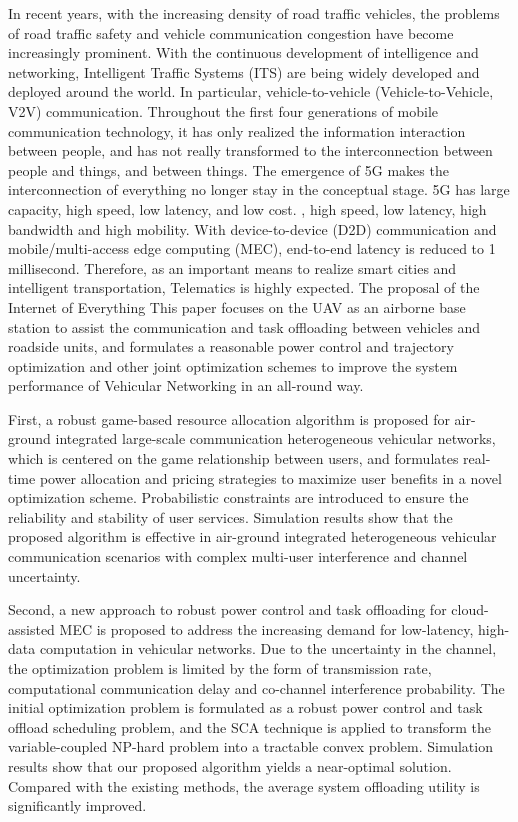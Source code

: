In recent years, with the increasing density of road traffic vehicles, the problems of road traffic safety and vehicle communication congestion have become increasingly prominent.
With the continuous development of intelligence and networking, Intelligent Traffic Systems (ITS) are being widely developed and deployed around the world. In particular,
vehicle-to-vehicle (Vehicle-to-Vehicle, V2V) communication. Throughout the first four generations of mobile communication technology, it has only realized the information interaction
between people, and has not really transformed to the interconnection between people and things, and between things. The emergence of 5G makes the interconnection of everything no
longer stay in the conceptual stage. 5G has large capacity, high speed, low latency, and low cost. , high speed, low latency, high bandwidth and high mobility. With device-to-device
(D2D) communication and mobile/multi-access edge computing (MEC), end-to-end latency is reduced to 1 millisecond. Therefore, as an important means to realize smart cities and intelligent
transportation, Telematics is highly expected. The proposal of the Internet of Everything This paper focuses on the UAV as an airborne base station to assist the communication and task
offloading between vehicles and roadside units, and formulates a reasonable power control and trajectory optimization and other joint optimization schemes to improve the system
performance of Vehicular Networking in an all-round way.

First, a robust game-based resource allocation algorithm is proposed for air-ground integrated large-scale communication heterogeneous vehicular networks, which is
centered on the game relationship between users, and formulates real-time power allocation and pricing strategies to maximize user benefits in a novel optimization
scheme. Probabilistic constraints are introduced to ensure the reliability and stability of user services. Simulation results show that the proposed algorithm is
effective in air-ground integrated heterogeneous vehicular communication scenarios with complex multi-user interference and channel uncertainty.

Second, a new approach to robust power control and task offloading for cloud-assisted MEC is proposed to address the increasing demand for low-latency,
high-data computation in vehicular networks. Due to the uncertainty in the channel, the optimization problem is limited by the form of transmission rate,
computational communication delay and co-channel interference probability. The initial optimization problem is formulated as a robust power control and
task offload scheduling problem, and the SCA technique is applied to transform the variable-coupled NP-hard problem into a tractable convex problem.
Simulation results show that our proposed algorithm yields a near-optimal solution. Compared with the existing methods, the average system offloading
utility is significantly improved.

